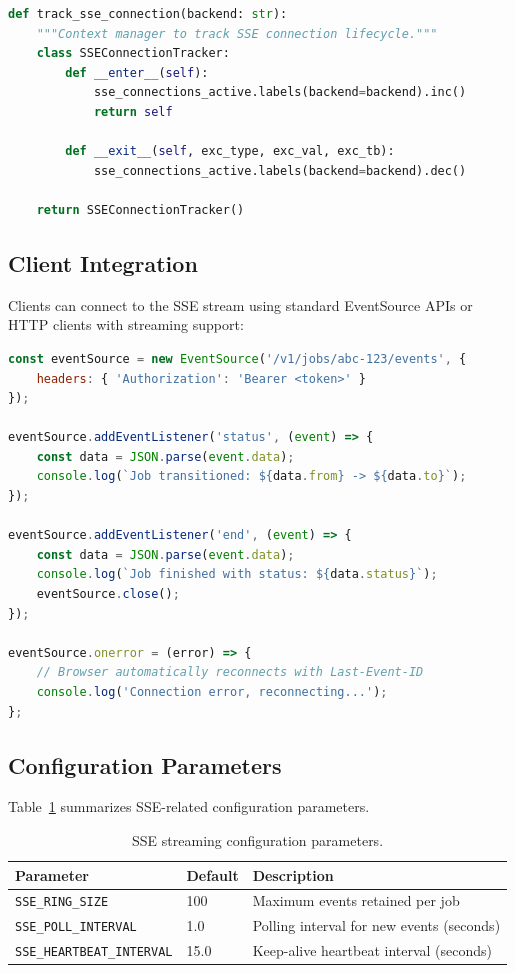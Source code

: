 \begin{lstlisting}[language=Python, caption={SSE connection tracking context manager.}]
def track_sse_connection(backend: str):
    """Context manager to track SSE connection lifecycle."""
    class SSEConnectionTracker:
        def __enter__(self):
            sse_connections_active.labels(backend=backend).inc()
            return self

        def __exit__(self, exc_type, exc_val, exc_tb):
            sse_connections_active.labels(backend=backend).dec()

    return SSEConnectionTracker()
\end{lstlisting}

\subsection{Client Integration}

Clients can connect to the SSE stream using standard EventSource APIs or HTTP clients with streaming support:

\begin{lstlisting}[language=JavaScript, caption={JavaScript EventSource client example.}]
const eventSource = new EventSource('/v1/jobs/abc-123/events', {
    headers: { 'Authorization': 'Bearer <token>' }
});

eventSource.addEventListener('status', (event) => {
    const data = JSON.parse(event.data);
    console.log(`Job transitioned: ${data.from} -> ${data.to}`);
});

eventSource.addEventListener('end', (event) => {
    const data = JSON.parse(event.data);
    console.log(`Job finished with status: ${data.status}`);
    eventSource.close();
});

eventSource.onerror = (error) => {
    // Browser automatically reconnects with Last-Event-ID
    console.log('Connection error, reconnecting...');
};
\end{lstlisting}

\subsection{Configuration Parameters}

Table~\ref{tab:sse-config} summarizes SSE-related configuration parameters.

\begin{table}[ht]
\centering
\caption{SSE streaming configuration parameters.}
\label{tab:sse-config}
\small
\begin{tabular}{lll}
\hline
\textbf{Parameter} & \textbf{Default} & \textbf{Description} \\
\hline
\texttt{SSE\_RING\_SIZE} & 100 & Maximum events retained per job \\
\texttt{SSE\_POLL\_INTERVAL} & 1.0 & Polling interval for new events (seconds) \\
\texttt{SSE\_HEARTBEAT\_INTERVAL} & 15.0 & Keep-alive heartbeat interval (seconds) \\
\hline
\end{tabular}
\end{table}


